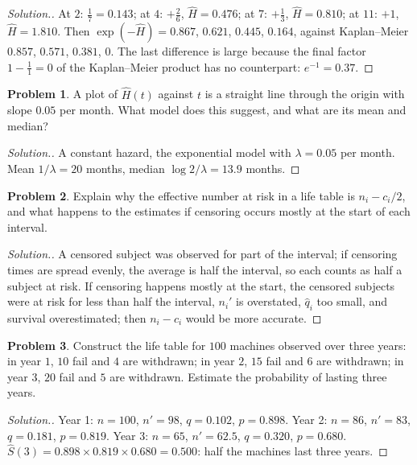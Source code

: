 \documentclass[11pt,a4paper]{article}
\numberwithin{equation}{section}
\theoremstyle{definition}
\newtheorem{problemx}{Problem}[subsection]
\newenvironment{problem}{\begin{problemx}}{\end{problemx}}
\newenvironment{solution}
  {\renewcommand{\qedsymbol}{}\begin{proof}[\textit{Solution}.]}
  {\end{proof}}
\begin{document}
\begin{solution}
At $2$: $\frac17 = 0.143$; at $4$: $+\frac26$, $\hat H = 0.476$; at $7$: $+\frac13$, $\hat H = 0.810$; at $11$: $+1$, $\hat H = 1.810$. Then $\exp(-\hat H) = 0.867$, $0.621$, $0.445$, $0.164$, against Kaplan--Meier $0.857$, $0.571$, $0.381$, $0$. The last difference is large because the final factor $1 - \frac11 = 0$
of the Kaplan--Meier product has no counterpart: $e^{-1} = 0.37$.
\end{solution}

\begin{problem}
A plot of $\hat H(t)$ against $t$ is a straight line through the origin with slope $0.05$ per month. What model does this suggest, and what are its mean and median?
\end{problem}

\begin{solution}
A constant hazard, the exponential model with $\lambda = 0.05$ per month. Mean $1/\lambda = 20$ months, median $\log 2/\lambda = 13.9$ months.
\end{solution}

\begin{problem}
Explain why the effective number at risk in a life table is $n_i - c_i/2$, and what happens to the estimates if censoring occurs mostly at the start of each interval.
\end{problem}

\begin{solution}
A censored subject was observed for part of the interval; if censoring times are spread evenly, the average is half the interval, so each counts as half a subject at risk. If censoring happens mostly at the start, the censored subjects were at risk for less than half the interval, $n_i'$ is overstated, $\hat q_i$ too small, and survival overestimated; then $n_i - c_i$
would be more accurate.
\end{solution}

\begin{problem}
Construct the life table for $100$ machines observed over three years: in year $1$, $10$ fail and $4$ are withdrawn; in year $2$, $15$ fail and $6$ are withdrawn; in year $3$, $20$ fail and $5$ are withdrawn. Estimate the probability of lasting three years.
\end{problem}

\begin{solution}
Year 1: $n = 100$, $n' = 98$, $q = 0.102$, $p = 0.898$. Year 2: $n = 86$, $n' = 83$, $q = 0.181$, $p = 0.819$. Year 3: $n = 65$, $n' = 62.5$, $q = 0.320$, $p = 0.680$. $\hat S(3) = 0.898 \times 0.819 \times 0.680 = 0.500$: half the machines last three years.
\end{solution}
\end{document}
